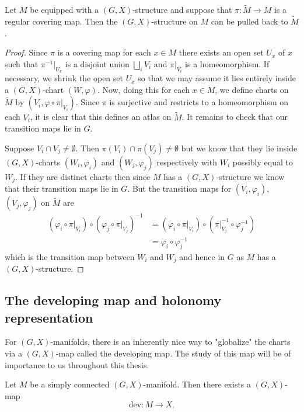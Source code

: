 \begin{lemma}\label{lemma:pullback-affine-structure}
    Let $M$ be equipped with a $(G,X)$-structure and suppose that $\pi: \tilde{M} \to M$ is a regular covering map. Then
    the $(G,X)$-structure on $M$ can be pulled back to $\tilde{M}$.
\end{lemma}
\begin{proof}
    Since $\pi$ is a covering map for each $x \in M$ there exists an open set $U_x$ of $x$ such that $\pi^{-1}|_{U_x}$ is a
    disjoint union $\bigsqcup_i V_i$ and $\pi|_{V_i}$ is a homeomorphism. If necessary, we shrink the open set $U_x$ so that we may assume it lies entirely inside a $(G,X)$-chart $(W, \varphi)$.
    Now, doing this for each $x \in M$, we define charts on $\tilde{M}$ by $(V_i, \varphi \circ \pi|_{V_i})$. Since $\pi$ is surjective and restricts to a homeomorphism on each $V_i$, it is clear that this defines
    an atlas on $\tilde{M}$. It remains to check that our transition maps lie in $G$.

    Suppose $V_i \cap V_j \neq \emptyset$. Then $\pi(V_i) \cap \pi(V_j) \neq
        \emptyset$ but we know that they lie inside $(G,X)$-charts $(W_i, \varphi_i)$
    and $(W_j, \varphi_j)$ respectively with $W_i$ possibly equal to $W_j$. If they
    are distinct charts then since $M$ has a $(G,X)$-structure we know that their
    transition maps lie in $G$. But the transition maps for $(V_i, \varphi_i)$,
    $(V_j, \varphi_j)$ on $\tilde{M}$ are
    \begin{align*}
        (\varphi_i \circ \pi|_{V_i}) \circ (\varphi_j \circ \pi|_{V_j})^{-1} & = (\varphi_i \circ \pi|_{V_i})\circ (\pi|_{V_j}^{-1} \circ\varphi_j^{-1}) \\
                                                                             & = \varphi_i \circ \varphi_j^{-1}
    \end{align*}
    which is the transition map between $W_i$ and $W_j$ and hence in $G$ as $M$ has a $(G,X)$-structure.
\end{proof}

\subsection{The developing map and holonomy representation}
For $(G,X)$-manifolds, there is an inherently nice way to "globalize" the
charts via a $(G,X)$-map called the developing map. The study of this map will
be of importance to us throughout this thesis.

\begin{prop}
    Let $M$ be a simply connected $(G,X)$-manifold. Then there exists a $(G,X)$-map
    $$
        \text{dev}: M \to X.
    $$
\end{prop}

